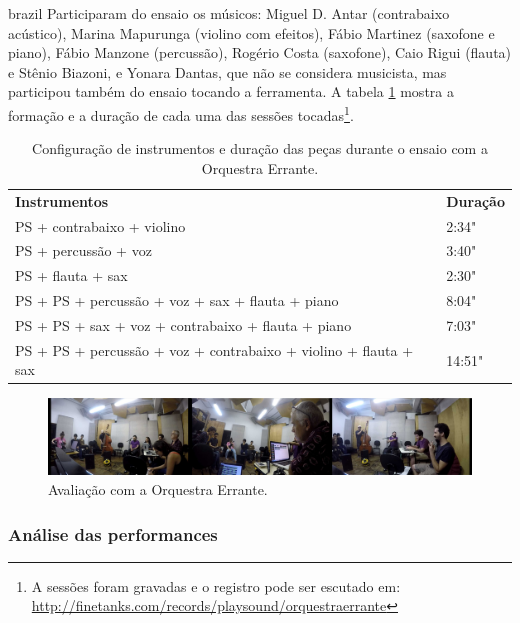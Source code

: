 \begin{otherlanguage*}{brazil}
Participaram do ensaio os músicos: Miguel D. Antar (contrabaixo acústico), Marina Mapurunga (violino com efeitos), Fábio Martinez (saxofone e piano), Fábio Manzone (percussão), Rogério Costa (saxofone), Caio Rigui (flauta) e Stênio Biazoni, e Yonara Dantas, que não se considera musicista, mas participou também do ensaio tocando a ferramenta. A tabela \ref{tab:orchestra} mostra a formação e a duração de cada uma das sessões tocadas\footnote{A sessões foram gravadas e o registro pode ser escutado em: \url{http://finetanks.com/records/playsound/orquestraerrante}}.  

\begin{table}[ht]
\caption{Configuração de instrumentos e duração das peças durante o ensaio com a Orquestra Errante.}
\begin{tabular}{ll}
\textbf{Instrumentos}                                                    & \textbf{Duração} \\
PS + contrabaixo + violino                                & 2:34"         \\
PS + percussão + voz                                                 & 3:40"         \\
PS + flauta + sax                                                        & 2:30"         \\
PS + PS + percussão + voz + sax + flauta + piano                      & 8:04"         \\
PS + PS + sax + voz + contrabaixo + flauta + piano                   & 7:03"         \\
PS + PS + percussão + voz + contrabaixo + violino + flauta + sax & 14:51"       
\end{tabular}
\label{tab:orchestra}
\end{table}



\begin{figure}
\centering
\includegraphics[width=1\textwidth]{pictures/cap4/orquestra_errante_usertest}
\caption{\label{psorquestra}Avaliação com a Orquestra Errante.}
\label{fig:psorquestra}
\end{figure}

\subsubsection{Análise das performances}


\end{otherlanguage*}
